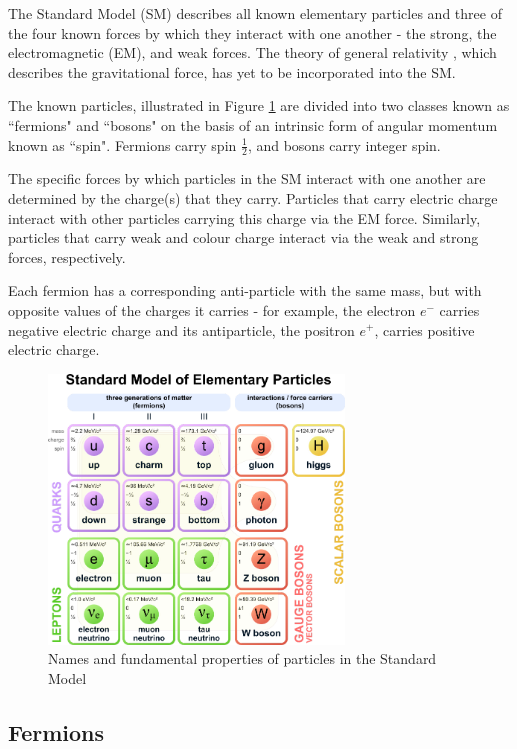 The Standard Model (SM) describes all known elementary particles and three of the four known forces by which they interact with one another - the strong, the electromagnetic (EM), and weak forces. The theory of general relativity \cite{einstein_1920}, which describes the gravitational force, has yet to be incorporated into the SM. 

The known particles, illustrated in Figure \ref{fig:standard_model} are divided into two classes known as ``fermions" and ``bosons" on the basis of an intrinsic form of angular momentum known as ``spin". Fermions carry spin \(\frac{1}{2}\), and bosons carry integer spin. 

The specific forces by which particles in the SM interact with one another are determined by the charge(s) that they carry. Particles that carry electric charge interact with other particles carrying this charge via the EM force. Similarly, particles that carry weak and colour charge interact via the weak and strong forces, respectively. 

Each fermion has a corresponding anti-particle with the same mass, but with opposite values of the charges it carries - for example, the electron \(e^-\) carries negative electric charge and its antiparticle, the positron \(e^+\), carries positive electric charge. 

\begin{figure}[H]
	\centering
	\includegraphics[width=0.7\textwidth]{Figures/1/StandardModel.pdf}
	\caption[]{Names and fundamental properties of particles in the Standard Model}
	\label{fig:standard_model}
\end{figure}

\subsection{Fermions}
\label{sec:fermions}

